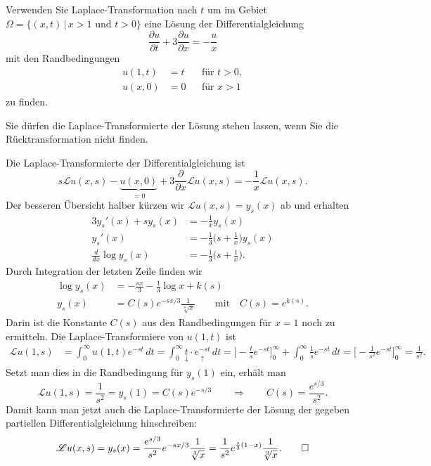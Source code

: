 Verwenden Sie Laplace-Transformation nach $t$ um
im Gebiet $\Omega=\{(x,t)\,|\, x > 1 \text{ und } t > 0\}$ eine
Lösung der Differentialgleichung
\begin{equation}
\frac{\partial u}{\partial t} +3\frac{\partial u}{\partial x} = -\frac{u}{x}
\label{50000012:dgl}
\end{equation}
mit den Randbedingungen
\begin{equation}
\begin{aligned}
u(1,t)&=t& &\text{für $t>0$},\\
u(x,0)&=0& &\text{für $x > 1$}
\end{aligned}
\label{50000012:rb}
\end{equation}
zu finden.

\begin{hinweis}
Sie dürfen die Laplace-Transformierte der Lösung stehen lassen, wenn Sie
die Rücktransformation nicht finden.
\end{hinweis}

\begin{loesung}
Die Laplace-Transformierte der Differentialgleichung ist
\[
s\mathscr{L}u(x,s) - \underbrace{u(x,0)}_{\displaystyle =0}
+ 3\frac{\partial }{\partial x}\mathscr{L}u(x,s)
=
-\frac1x\mathscr{L}u(x,s).
\]
Der besseren Übersicht halber kürzen wir $\mathscr{L}u(x,s)=y_s(x)$ ab
und erhalten
\begin{align*}
3y_s'(x) + sy_s(x) &= -\frac1x y_s(x)
\\
y_s'(x)&=-\frac13\biggl(s+\frac1x\biggr) y_s(x)
\\
\frac{d}{dx} \log y_s(x) &= -\frac13\biggl(s+\frac1x\biggr).
\end{align*}
Durch Integration der letzten Zeile finden wir
\begin{align*}
\log y_s(x) &= -\frac{sx}{3}-\frac13\log x + k(s)
\\
y_s(x) &= C(s) e^{-sx/3}\frac1{\sqrt[3]{x}}\qquad\text{mit}\quad C(s)=e^{k(s)}.
\end{align*}
Darin ist die Konstante $C(s)$ aus den Randbedingungen für $x=1$
noch zu ermitteln.
Die Laplace-Transformiere von $u(1,t)$ ist
\begin{align*}
\mathscr{L}u(1,s)
&=
\int_0^\infty u(1,t)e^{-st}\,dt
=
\int_0^\infty \underset{\downarrow}{t}\cdot\underset{\uparrow}{e^{-st}}\,dt
=
\biggl[-\frac{t}se^{-st}\biggr]_0^\infty
+\int_0^\infty \frac1s e^{-st}\,dt
=
\biggl[ -\frac1{s^2}e^{-st}\biggr]_0^\infty=\frac1{s^2}.
\end{align*}
Setzt man dies in die Randbedingung für $y_s(1)$ ein, erhält man
\[
\mathscr{L}u(1,s) = \frac1{s^2} = y_s(1)=C(s) e^{-s/3}
\qquad
\Rightarrow
\qquad
C(s) = \frac{e^{s/3}}{s^2}.
\]
Damit kann man jetzt auch die Laplace-Transformierte der Lösung der gegeben
partiellen Differentialgleichung hinschreiben:
\[
\mathscr{L}u(x,s)
=
y_s(x)
=
\frac{e^{s/3}}{s^2}e^{-sx/3}\frac1{\sqrt[3]{x}}
=
\frac1{s^2}e^{\frac{s}3(1-x)}\frac1{\sqrt[3]{x}}.
\qedhere
\]
\end{loesung}

